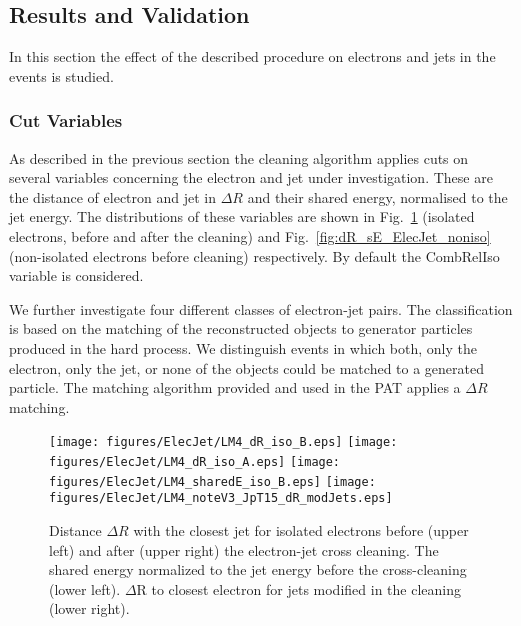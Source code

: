 \documentclass{cmspaper}
\begin{document}
\subsection{Results and Validation}
In this section the effect of the described procedure on electrons and jets in
the events is studied. 

\subsubsection{Cut Variables}
As described in the previous section the cleaning algorithm applies cuts on
several variables concerning the electron and jet under investigation. These are
the distance of electron and jet in $\Delta R$ and their shared energy,
normalised to the jet energy. The distributions of these variables are shown
in Fig.~\ref{fig:dR_sE_ElecJet_iso} (isolated electrons, before and after the
cleaning) and Fig.~\ref{fig:dR_sE_ElecJet_noniso} (non-isolated electrons
before cleaning) respectively. By default the CombRelIso variable is considered.

We further investigate four different classes of electron-jet pairs. The
classification is based on the matching of the reconstructed objects
to generator particles produced in the hard process. We distinguish events in
which both, only the electron, only the jet, or none of the objects could be matched to a generated
particle. The matching algorithm provided and used in the PAT applies a $\Delta
R$ matching.

\begin{figure}[htbp]
\begin{center}
    \texttt{[image: figures/ElecJet/LM4\_dR\_iso\_B.eps]}
    \texttt{[image: figures/ElecJet/LM4\_dR\_iso\_A.eps]}
    \texttt{[image: figures/ElecJet/LM4\_sharedE\_iso\_B.eps]}
    \texttt{[image: figures/ElecJet/LM4\_noteV3\_JpT15\_dR\_modJets.eps]}
    \caption{Distance \(\Delta R\)  with the closest jet for isolated electrons
before (upper left) and after (upper right) the electron-jet cross cleaning. 
The shared energy normalized to the jet energy before the cross-cleaning (lower left). 
$\Delta$R to closest electron for jets modified in the cleaning (lower right).}
\label{fig:dR_sE_ElecJet_iso}
\end{center}
\end{figure}
\end{document}
